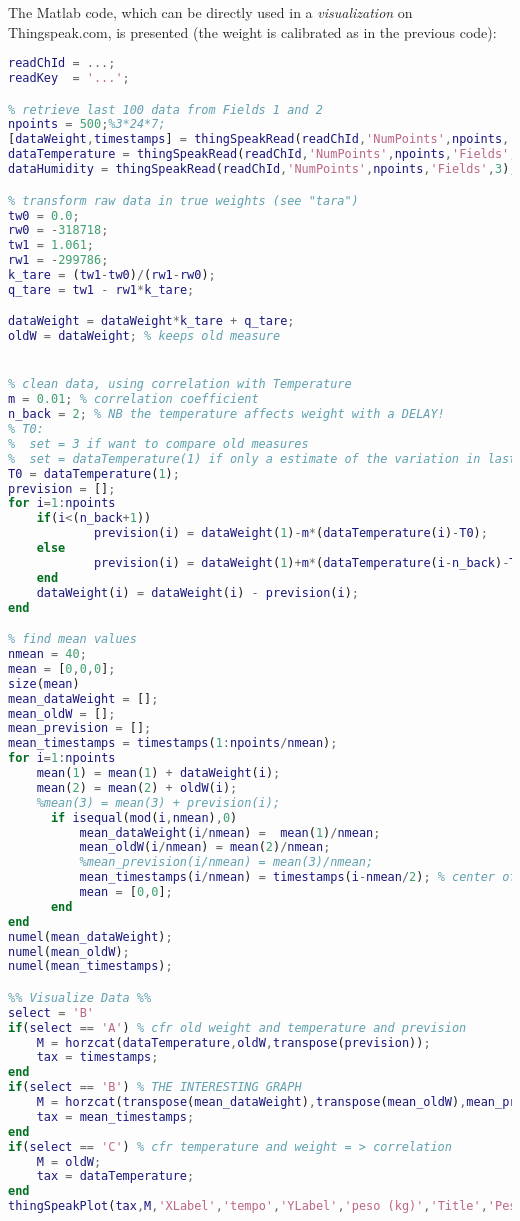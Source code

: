 The Matlab code, which can be directly used in a \textit{visualization} on Thingspeak.com, is presented (the weight is calibrated as in the previous code):
\begin{lstlisting}[language=Matlab]
% read/write variables
readChId = ...;
readKey  = '...';

% retrieve last 100 data from Fields 1 and 2
npoints = 500;%3*24*7;
[dataWeight,timestamps] = thingSpeakRead(readChId,'NumPoints',npoints,'Fields',4);%,'ReadKey',readKey);
dataTemperature = thingSpeakRead(readChId,'NumPoints',npoints,'Fields',2);%,'ReadKey',readKey);
dataHumidity = thingSpeakRead(readChId,'NumPoints',npoints,'Fields',3);

% transform raw data in true weights (see "tara")
tw0 = 0.0;
rw0 = -318718;
tw1 = 1.061;
rw1 = -299786;
k_tare = (tw1-tw0)/(rw1-rw0);
q_tare = tw1 - rw1*k_tare;

dataWeight = dataWeight*k_tare + q_tare;
oldW = dataWeight; % keeps old measure


% clean data, using correlation with Temperature
m = 0.01; % correlation coefficient
n_back = 2; % NB the temperature affects weight with a DELAY!
% T0:
%  set = 3 if want to compare old measures
%  set = dataTemperature(1) if only a estimate of the variation in last days is wanted
T0 = dataTemperature(1);
prevision = [];
for i=1:npoints
    if(i<(n_back+1))
            prevision(i) = dataWeight(1)-m*(dataTemperature(i)-T0);
    else
            prevision(i) = dataWeight(1)+m*(dataTemperature(i-n_back)-T0);
    end
    dataWeight(i) = dataWeight(i) - prevision(i);
end

% find mean values
nmean = 40;
mean = [0,0,0];
size(mean)
mean_dataWeight = [];
mean_oldW = [];
mean_prevision = [];
mean_timestamps = timestamps(1:npoints/nmean);
for i=1:npoints
    mean(1) = mean(1) + dataWeight(i);
    mean(2) = mean(2) + oldW(i);
    %mean(3) = mean(3) + prevision(i);
      if isequal(mod(i,nmean),0)
          mean_dataWeight(i/nmean) =  mean(1)/nmean;
          mean_oldW(i/nmean) = mean(2)/nmean;
          %mean_prevision(i/nmean) = mean(3)/nmean;
          mean_timestamps(i/nmean) = timestamps(i-nmean/2); % center of interval
          mean = [0,0];
      end       
end
numel(mean_dataWeight);
numel(mean_oldW);
numel(mean_timestamps);

%% Visualize Data %%
select = 'B'
if(select == 'A') % cfr old weight and temperature and prevision
    M = horzcat(dataTemperature,oldW,transpose(prevision));
    tax = timestamps; 
end
if(select == 'B') % THE INTERESTING GRAPH
    M = horzcat(transpose(mean_dataWeight),transpose(mean_oldW),mean_prevision);
    tax = mean_timestamps;
end
if(select == 'C') % cfr temperature and weight = > correlation
    M = oldW;
    tax = dataTemperature;
end 
thingSpeakPlot(tax,M,'XLabel','tempo','YLabel','peso (kg)','Title','Peso arnia (rispetto a peso originale)','Legend',{'corretto','misurato'});
\end{lstlisting}
